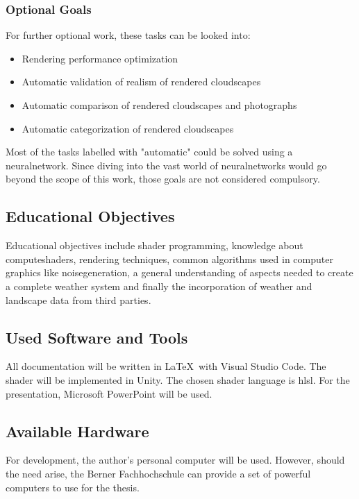 \subsubsection{Optional Goals}
\label{section:goals:optional}
For further optional work, these tasks can be looked into:
\begin{itemize}
    \item Rendering performance optimization
    \item Automatic validation of realism of rendered cloudscapes
    \item Automatic comparison of rendered cloudscapes and photographs
    \item Automatic categorization of rendered cloudscapes
\end{itemize}

\noindent
Most of the tasks labelled with "automatic" could be solved using a \gls{neuralnetwork}.
Since diving into the vast world of \gls{neuralnetwork}s would go beyond the scope of this work, those goals are not considered compulsory.

\subsection{Educational Objectives}
Educational objectives include \gls{shader} programming, knowledge about \gls{computeshader}s, rendering techniques, common algorithms used in computer graphics like \gls{noisegeneration}, a general understanding of aspects needed to create a complete weather system and finally the incorporation of weather and landscape data from third parties.

\subsection{Used Software and Tools}
All documentation will be written in \LaTeX\  with Visual Studio Code.
The \gls{shader} will be implemented in Unity. The chosen \gls{shader} language is \gls{hlsl}.
For the presentation, Microsoft PowerPoint will be used.

\subsection{Available Hardware}
For development, the author's personal computer will be used. However, should the need arise, the Berner Fachhochschule can provide a set of powerful computers to use for the thesis.